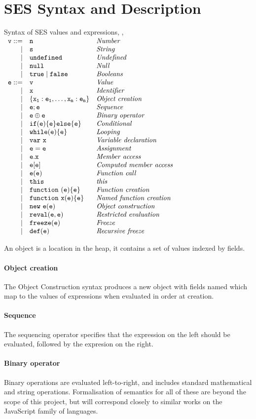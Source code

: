 \documentclass[a4paper]{article}
\begin{document}
\section{SES Syntax and Description}

\newcommand{\syntaxline}[3][\pipe]{#1 & \js{#2} & \textit{#3}\\}
\begin{display}{Syntax of SES values and expressions, , }
  $\begin{array}{rll}
    \syntaxline[\js{v} ::=]{n}{Number}
    \syntaxline{s}{String}
    \syntaxline{\und}{Undefined}
    \syntaxline{\nil}{Null}
    \syntaxline{\true \pipe \false}{Booleans}
    \syntaxline[\js{e} ::=]{v}{Value}
    \syntaxline{x}{Identifier}
    \syntaxline{\{x_1:e_1, \ldots, x_n:e_n\}}{Object creation}
    \syntaxline{e; e}{Sequence}
    \syntaxline{e \oplus e}{Binary operator}
    \syntaxline{if(e) \{e\} else \{e\}}{Conditional}
    \syntaxline{while(e) \{e\}}{Looping}
    \syntaxline{\jsvar{x}}{Variable declaration}
    \syntaxline{e = e}{Assignment}
    \syntaxline{e.x}{Member access}
    \syntaxline{e[e]}{Computed member access}
    \syntaxline{e(e)}{Function call}
    \syntaxline{this}{this}
    \syntaxline{\jsfun{e}{e}}{Function creation}
    \syntaxline{\jsfun[x]{e}{e}}{Named function creation}
    \syntaxline{\jsnew{e}{e}}{Object construction}
    \syntaxline{reval(e, e)}{Restricted evaluation}
    \syntaxline{freeze(e)}{Freeze}
    \syntaxline{def(e)}{Recursive freeze}
  \end{array}$
\end{display}

An object is a location in the heap, it contains a set of
values indexed by fields.

\paragraph{Object creation}  The Object Construction syntax produces a new object
with fields named  which map to the values of expressions
 when evaluated in order at creation.

\paragraph{Sequence} The sequencing operator specifies that the expression on the left should be
evaluated, followed by the expresion on the right.

\paragraph{Binary operator} Binary operations are evaluated left-to-right, and includes standard
mathematical and string operations. Formalisation of semantics for all of these
are beyond the scope of this project, but will correspond closely to similar
works on the JavaScript family of languages.
\end{document}
